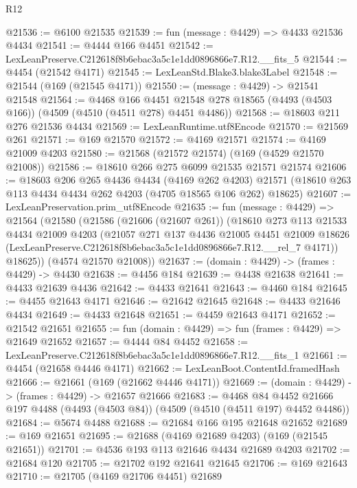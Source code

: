 \begin{lexlean}{R12}
\begin{coremodule}
@21536 := @6100 @21535
@21539 := fun (message : @4429) => @4433 @21536 @4434
@21541 := @4444 @166 @4451
@21542 := LexLeanPreserve.C212618f8b6ebac3a5c1e1dd0896866e7.R12.__fits_5
@21544 := @4454 (@21542 @4171)
@21545 := LexLeanStd.Blake3.blake3Label
@21548 := @21544 (@169 (@21545 @4171))
@21550 := (message : @4429) -> @21541 @21548
@21564 := @4468
    @166
    @4451
    @21548
    @278
    @18565
    (@4493 (@4503 @166))
    (@4509 (@4510 (@4511 @278) @4451 @4486))
@21568 := @18603 @211 @276 @21536 @4434
@21569 := LexLeanRuntime.utf8Encode
@21570 := @21569 @261
@21571 := @169 @21570
@21572 := @4169 @21571
@21574 := @4169 @21009 @4203
@21580 := @21568 (@21572 @21574) (@169 (@4529 @21570 @21008))
@21586 := @18610 @266 @275 @6099 @21535 @21571 @21574
@21606 := @18603
    @206
    @265
    @4436
    @4434
    (@4169 @262 @4203)
    @21571
    (@18610 @263 @113 @4434 @4434 @262 @4203 (@4705 @18565 @106 @262) @18625)
@21607 := LexLeanPreservation.prim_utf8Encode
@21635 := fun (message : @4429) =>
  @21564
    (@21580
      (@21586
        (@21606 (@21607 @261))
        (@18610
          @273
          @113
          @21533
          @4434
          @21009
          @4203
          (@21057
            @271
            @137
            @4436
            @21005
            @4451
            @21009
            @18626
            (LexLeanPreserve.C212618f8b6ebac3a5c1e1dd0896866e7.R12.__rel_7 @4171))
          @18625))
      (@4574 @21570 @21008))
@21637 := (domain : @4429) -> (frames : @4429) -> @4430
@21638 := @4456 @184
@21639 := @4438 @21638
@21641 := @4433 @21639 @4436
@21642 := @4433 @21641
@21643 := @4460 @184
@21645 := @4455 @21643 @4171
@21646 := @21642 @21645
@21648 := @4433 @21646 @4434
@21649 := @4433 @21648
@21651 := @4459 @21643 @4171
@21652 := @21542 @21651
@21655 := fun (domain : @4429) => fun (frames : @4429) => @21649 @21652
@21657 := @4444 @84 @4452
@21658 := LexLeanPreserve.C212618f8b6ebac3a5c1e1dd0896866e7.R12.__fits_1
@21661 := @4454 (@21658 @4446 @4171)
@21662 := LexLeanBoot.ContentId.framedHash
@21666 := @21661 (@169 (@21662 @4446 @4171))
@21669 := (domain : @4429) -> (frames : @4429) -> @21657 @21666
@21683 := @4468
    @84
    @4452
    @21666
    @197
    @4488
    (@4493 (@4503 @84))
    (@4509 (@4510 (@4511 @197) @4452 @4486))
@21684 := @5674 @4488
@21688 := @21684 @166 @195 @21648 @21652
@21689 := @169 @21651
@21695 := @21688 (@4169 @21689 @4203) (@169 (@21545 @21651))
@21701 := @4536 @193 @113 @21646 @4434 @21689 @4203
@21702 := @21684 @120
@21705 := @21702 @192 @21641 @21645
@21706 := @169 @21643
@21710 := @21705 (@4169 @21706 @4451) @21689

\end{coremodule}
\end{lexlean}
